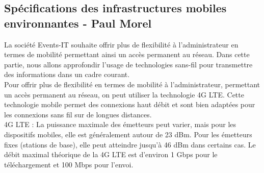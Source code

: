 \documentclass[12]{article}
\begin{document}
\subsection{Spécifications des infrastructures mobiles environnantes - Paul Morel}

La société Events-IT souhaite offrir plus de flexibilité à l’administrateur en termes de mobilité permettant ainsi un accès permanent au réseau. Dans cette partie, nous allons approfondir l'usage de technologies sans-fil pour transmettre des informations dans un cadre courant. \\

Pour offrir plus de flexibilité en termes de mobilité à l'administrateur, permettant un accès permanent au réseau, on peut utiliser la technologie 4G LTE. Cette technologie mobile permet des connexions haut débit et sont bien adaptées pour les connexions sans fil sur de longues distances.\\ 

4G LTE : La puissance maximale des émetteurs peut varier, mais pour les dispositifs mobiles, elle est généralement autour de 23 dBm. Pour les émetteurs fixes (stations de base), elle peut atteindre jusqu'à 46 dBm dans certains cas. Le débit maximal théorique de la 4G LTE est d'environ 1 Gbps pour le téléchargement et 100 Mbps pour l'envoi.
\end{document}
